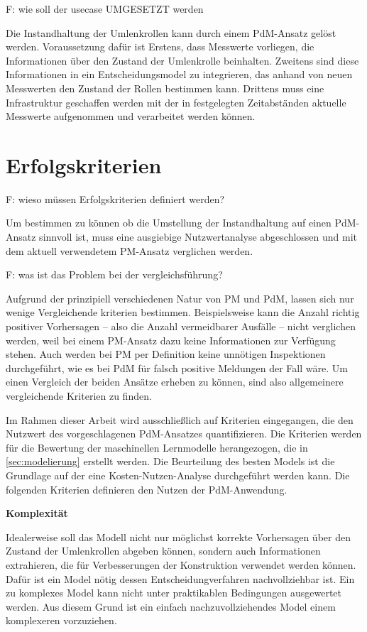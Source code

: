 F: wie soll der usecase UMGESETZT werden

Die Instandhaltung der Umlenkrollen kann durch einem PdM-Ansatz gelöst werden. Voraussetzung dafür ist Erstens, dass Messwerte vorliegen, die Informationen über den Zustand der Umlenkrolle beinhalten. Zweitens sind diese Informationen in ein Entscheidungsmodel zu integrieren, das anhand von neuen Messwerten den Zustand der Rollen bestimmen kann. Drittens muss eine Infrastruktur geschaffen werden mit der in festgelegten Zeitabständen aktuelle Messwerte aufgenommen und verarbeitet werden können.
\section{Erfolgskriterien}
\label{sec:erfolgskriterien_usecase}
F: wieso müssen Erfolgskriterien definiert werden?

Um bestimmen zu können ob die Umstellung der Instandhaltung auf einen PdM-Ansatz sinnvoll ist, muss eine ausgiebige Nutzwertanalyse abgeschlossen und mit dem aktuell verwendetem PM-Ansatz verglichen werden. 

F: was ist das Problem bei der vergleichsführung?

Aufgrund der prinzipiell verschiedenen Natur von PM und PdM, lassen sich nur wenige Vergleichende kriterien bestimmen. Beispielsweise kann die Anzahl richtig positiver Vorhersagen -- also die Anzahl vermeidbarer Ausfälle -- nicht verglichen werden, weil bei einem PM-Ansatz dazu keine Informationen zur Verfügung stehen. Auch werden bei PM per Definition keine unnötigen Inspektionen durchgeführt, wie es bei PdM für falsch positive Meldungen der Fall wäre. Um einen Vergleich der beiden Ansätze erheben zu können, sind also allgemeinere vergleichende Kriterien zu finden.

Im Rahmen dieser Arbeit wird ausschließlich auf Kriterien eingegangen, die den Nutzwert des vorgeschlagenen PdM-Ansatzes quantifizieren. Die Kriterien werden für die Bewertung der maschinellen Lernmodelle herangezogen, die in \cref{sec:modelierung} erstellt werden. Die Beurteilung des besten Models ist die Grundlage auf der eine Kosten-Nutzen-Analyse durchgeführt werden kann. Die folgenden Kriterien definieren den Nutzen der PdM-Anwendung.

\textbf{Komplexität}

Idealerweise soll das Modell nicht nur möglichst korrekte Vorhersagen über den Zustand der Umlenkrollen abgeben können, sondern auch Informationen extrahieren, die für Verbesserungen der Konstruktion verwendet werden können. Dafür ist ein Model nötig dessen Entscheidungverfahren nachvollziehbar ist. Ein zu komplexes Model kann nicht unter praktikablen Bedingungen ausgewertet werden. Aus diesem Grund ist ein einfach nachzuvollziehendes Model einem komplexeren vorzuziehen.

